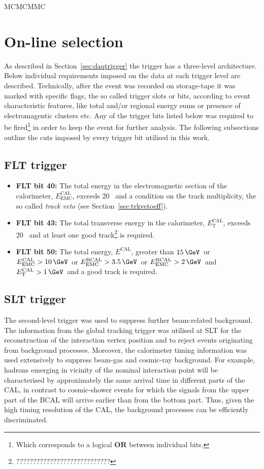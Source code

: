 MCMCMMC

\section{On-line selection}
\label{sec:onlineselect}
As described in Section~\ref{sec:daqtrigger} the \zeus trigger has a three-level architecture. Below individual requirements imposed on the data at each trigger level are described. Technically, after the event was recorded on storage-tape it was marked with specific flags, the so called trigger slots or bits, according to event characteristic features, like total and/or regional energy sums or presence of electromagentic clusters etc. Any of the trigger bits listed below was required to be fired\footnote{Which corresponds to a logical \textbf{OR} between individual bits.} in order to keep the event for further analysis. The following subsections outline the cuts imposed by every trigger bit utilised in this work. 

\subsection{FLT trigger}
\label{subsec:fltcuts}
\begin{itemize}
	\item \textbf{FLT bit 40:} The total energy in the electromagnetic section of the calorimeter, $E_\text{EMC}^\text{CAL}$, exceeds 20 \GeV\, and a condition on the track multiplicity, the so called \textit{track veto} (see Section~\ref{sec:trkvetoeff}).
	\item \textbf{FLT bit 43:} The total transverse energy in the calorimeter, $E_\text{T}^\text{CAL}$, exceeds 20 \GeV\, and at least one good track\footnote{????????????????????????????} is required.
	\item \textbf{FLT bit 50:} The total energy, $E^\text{CAL}$, greater than $15\, \GeV$\, or $E_\text{EMC}^\text{CAL} > 10\, \GeV\,$ or $E_\text{EMC}^\text{BCAL} > 3.5\, \GeV$\, or $E_\text{EMC}^\text{RCAL} > 2\, \GeV$\, and $E_\text{T}^\text{CAL} > 1\, \GeV$\, and a good track is required.
\end{itemize}

\subsection{SLT trigger}
\label{subsec:sltcuts}
The second-level trigger was used to suppress further beam-related background. The information from the \zeus global tracking trigger was utilised at SLT for the reconstruction of the interaction vertex position and to reject events originating from background processes. Moreover, the calorimeter timing information was used extensively to suppress beam-gas and cosmic-ray background. For example, hadrons emerging in vicinity of the nominal interaction point will be characterised by approximately the same arrival time in different parts of the CAL, in contrast to cosmic-shower events for which the signals from the upper part of the BCAL will arrive earlier than from the bottom part. Thus, given the high timing resolution of the CAL, the background processes can be efficiently discriminated.

